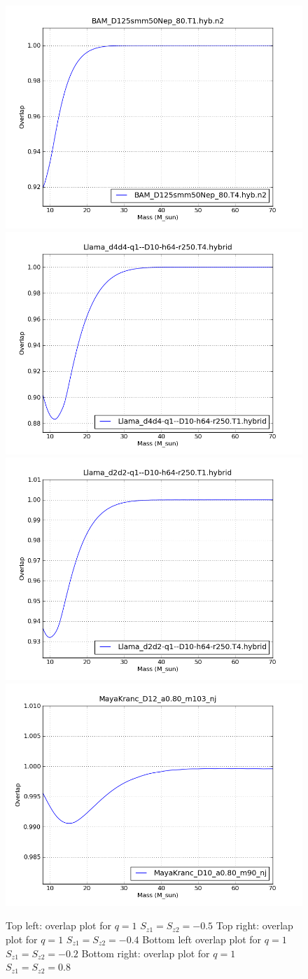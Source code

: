 \begin{figure}
  \includegraphics[width=0.5\linewidth]{figures/ninja2/figure_1_-0d5_01.png}
  \includegraphics[width=0.5\linewidth]{figures/ninja2/figure_1_-0d4_01.png} \\
  \includegraphics[width=0.5\linewidth]{figures/ninja2/figure_1_-0d2_01.png}
  \includegraphics[width=0.5\linewidth]{figures/ninja2/figure_1_0d8_01.png}
  \caption[Multiple NINJA-2 overlap plots]{
  \label{f:figure_1_-0d5}
Top left: overlap plot for $q=1$ $S_{z1} = S_{z2} = -0.5$
Top right: overlap plot for $q=1$ $S_{z1} = S_{z2} = -0.4$
Bottom left overlap plot for $q=1$ $S_{z1} = S_{z2} = -0.2$
Bottom right: overlap plot for $q=1$ $S_{z1} = S_{z2} = 0.8$}
\end{figure}%


